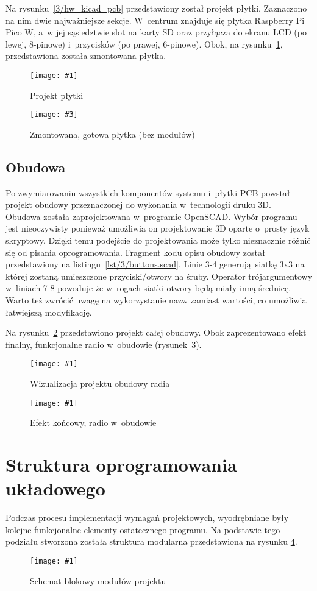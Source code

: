 \documentclass[polish]{aghengthesis}
\newcommand{\imgint}[4]{
	\begin{figure}[{#4}]
		\centering
		\texttt{[image: \#1]}
		\caption{#2}
		\label{#1}
	\end{figure}
}
\newcommand{\imgh}[3]{\imgint{#1}{#2}{#3}{H}}
\newcommand{\imgintss}[5]{
	\begin{figure}[{#5}]
		\centering
		\begin{minipage}{.45\textwidth}
			\centering
			\texttt{[image: \#1]}
			\caption{#2}
			\label{#1}
		\end{minipage}%
		\hfill
		\begin{minipage}{.45\textwidth}
			\centering
			\texttt{[image: \#3]}
			\caption{#4}
			\label{#3}
		\end{minipage}
	\end{figure}
}
\newcommand{\imghss}[4]{\imgintss{#1}{#2}{#3}{#4}{H}}
\newcommand{\lstfile}[3]{
	\noindent
	\hspace{0.1\linewidth}
	\begin{minipage}{0.8\linewidth}
		
	\end{minipage}
	\vspace{0.3cm}
}
\begin{document}
			Na rysunku~\ref{3/hw_kicad_pcb} przedstawiony został projekt płytki. Zaznaczono na nim dwie najważniejsze sekcje. W~centrum znajduje się płytka Raspberry Pi Pico W, a~w jej sąsiedztwie slot na karty SD oraz przyłącza do ekranu LCD (po lewej, 8-pinowe) i~przycisków (po prawej, 6-pinowe). Obok, na rysunku~\ref{3/hw_pcb}, przedstawiona została zmontowana płytka.
			
			\imghss{3/hw_kicad_pcb}{Projekt płytki}{3/hw_pcb}{Zmontowana, gotowa płytka (bez modułów)}
			
		\subsection{Obudowa}
			Po zwymiarowaniu wszystkich komponentów systemu i~płytki PCB powstał projekt obudowy przeznaczonej do wykonania w~technologii druku 3D.
			$ $\\
			
			Obudowa została zaprojektowana w~programie OpenSCAD\textsuperscript{\cite{hw_openscad}}. Wybór programu jest nieoczywisty ponieważ umożliwia on projektowanie 3D oparte o~prosty język skryptowy. Dzięki temu podejście do projektowania może tylko nieznacznie różnić się od pisania oprogramowania. Fragment kodu opisu obudowy został przedstawiony na listingu~\ref{lst/3/buttons.scad}. Linie 3-4 generują siatkę 3x3 na której zostaną umieszczone przyciski/otwory na śruby. Operator trójargumentowy w~liniach 7-8 powoduje że w~rogach siatki otwory będą miały inną średnicę. Warto też zwrócić uwagę na wykorzystanie nazw zamiast wartości, co umożliwia łatwiejszą modyfikację.
			
			\lstfile{scad}{Kod generujący otwory na przyciski i~śruby montażowe}{lst/3/buttons.scad}
			\pagebreak
			
			Na rysunku~\ref{3/hw_scad_case} przedstawiono projekt całej obudowy. Obok zaprezentowano efekt finalny, funkcjonalne radio w~obudowie (rysunek~\ref{3/hw_case}).
			\imgh{3/hw_scad_case}{Wizualizacja projektu obudowy radia}{0.8}
			\imgh{3/hw_case}{Efekt końcowy, radio w~obudowie}{0.8}
			\pagebreak
	
	\section{Struktura oprogramowania układowego}
		Podczas procesu implementacji wymagań projektowych, wyodrębniane były kolejne funkcjonalne elementy ostatecznego programu.
		Na podstawie tego podziału stworzona została struktura modularna przedstawiona na rysunku \ref{3/PicoRadio-code-block-diagram}.
		\imgh{3/PicoRadio-code-block-diagram}{Schemat blokowy modułów projektu}{0.75}
		
\end{document}

